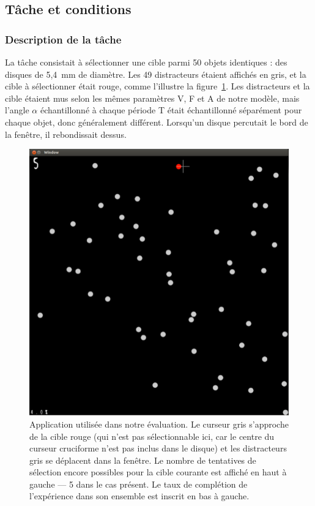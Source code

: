 	\subsection{Tâche et conditions}
	\subsubsection{Description de la tâche}
	La tâche consistait à sélectionner une cible parmi 50 objets identiques : des disques de 5,4~mm de diamètre. Les 49 \og distracteurs \fg{} étaient affichés en gris, et la cible à sélectionner était rouge, comme l'illustre la figure~\ref{fig:app}. Les distracteurs et la cible étaient mus selon les mêmes paramètres V, F et A de notre modèle, mais l'angle $\alpha$ échantillonné à chaque période T était échantillonné séparément pour chaque objet, donc généralement différent. Lorsqu'un disque \og percutait \fg{} le bord de la fenêtre, il \og rebondissait \fg{} dessus.
	
	\begin{figure}[!htb]
		\centering
		\includegraphics[width=\textwidth]{figures/ch4/app}
		\caption[Application utilisée dans notre évaluation]{Application utilisée dans notre évaluation. Le curseur gris s'approche de la cible rouge (qui n'est pas sélectionnable ici, car le centre du curseur cruciforme n'est pas inclus dans le disque) et les distracteurs gris se déplacent dans la fenêtre. Le nombre de tentatives de sélection encore possibles pour la cible courante est affiché en haut à gauche --- 5 dans le cas présent. Le taux de complétion de l'expérience dans son ensemble est inscrit en bas à gauche.}
		\label{fig:app}
	\end{figure}
	
